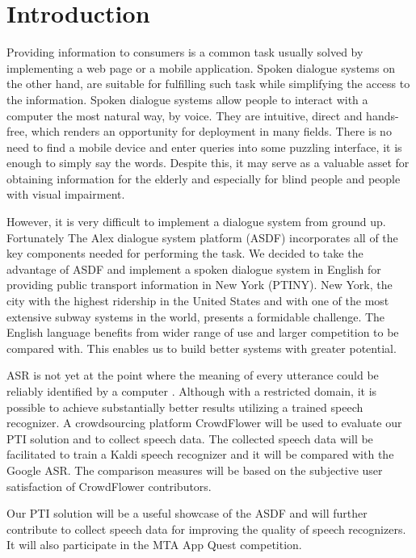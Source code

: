

\chapter*{Introduction}

Providing information to consumers is a common task usually solved by implementing a web page or a mobile application.
Spoken dialogue systems on the other hand, are suitable for fulfilling such task while simplifying the access to the information.
Spoken dialogue systems allow people to interact with a computer the most natural way, by voice.
They are intuitive, direct and hands-free, which renders an opportunity for deployment in many fields.
There is no need to find a mobile device and enter queries into some puzzling interface, it is enough to simply say the words.
Despite this, it may serve as a valuable asset for obtaining information for the elderly and especially for blind people and people with visual impairment. %

However, it is very difficult to implement a dialogue system from ground up.
Fortunately The Alex dialogue system platform\cite{asdf} (\ac{ASDF}) incorporates all of the key components needed for performing the task.
We decided to take the advantage of ASDF and implement a spoken dialogue system in English for providing public transport information in New York (PTINY).
New York, the city with the highest ridership in the United States and with one of the most extensive subway systems in the world, presents a formidable challenge.
The English language benefits from wider range of use and larger competition to be compared with.
This enables us to build better systems with greater potential.

\acf{ASR} is not yet at the point where the meaning of every utterance could be reliably identified by a computer \cite{asr}.
Although with a restricted domain, it is possible to achieve substantially better results utilizing a trained speech recognizer.
A crowdsourcing platform CrowdFlower will be used to evaluate our PTI solution and to collect speech data.
The collected speech data will be facilitated to train a Kaldi speech recognizer and it will be compared with the Google \ac{ASR}.
The comparison measures will be based on the subjective user satisfaction of CrowdFlower contributors. %

Our PTI solution will be a useful showcase of the ASDF and will further contribute to collect speech data for improving the quality of speech recognizers. It will also participate in the MTA App Quest competition.

